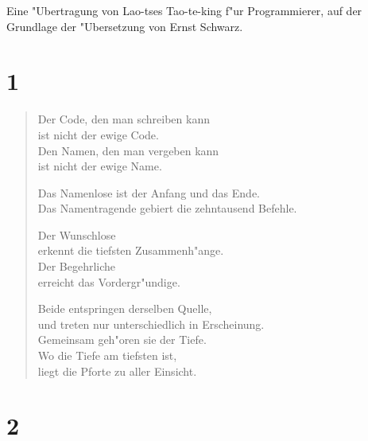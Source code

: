 \documentclass[a4paper,10pt]{book}
\begin{document}
Eine "Ubertragung von Lao-tses Tao-te-king f"ur Programmierer, auf der Grundlage
der "Ubersetzung von Ernst Schwarz.

\chapter{1}

\begin{verse}
Der Code, den man schreiben kann\\
ist nicht der ewige Code.\\
Den Namen, den man vergeben kann\\
ist nicht der ewige Name.

Das Namenlose ist der Anfang und das Ende.\\
Das Namentragende gebiert die zehntausend Befehle.

Der Wunschlose\\
erkennt die tiefsten Zusammenh"ange.\\
Der Begehrliche\\
erreicht das Vordergr"undige.

Beide entspringen derselben Quelle,\\
und treten nur unterschiedlich in Erscheinung.\\
Gemeinsam geh"oren sie der Tiefe.\\
Wo die Tiefe am tiefsten ist,\\
liegt die Pforte zu aller Einsicht.
\end{verse}

\chapter{2}

\begin{verse}
\end{verse}
\end{document}
